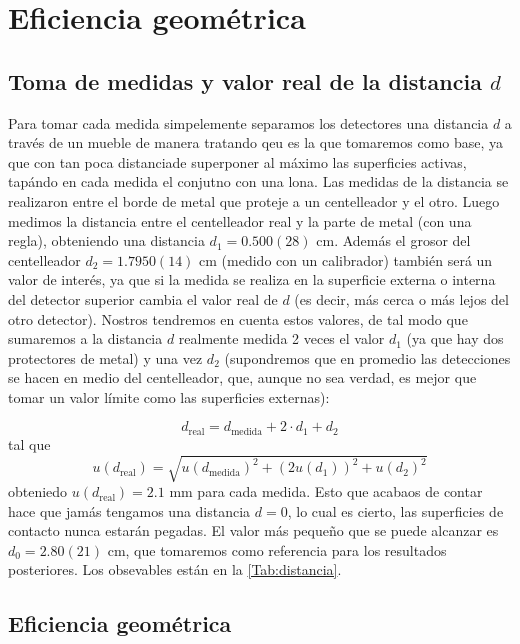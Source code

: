 \documentclass[11pt]{article}
\begin{document}
\section{Eficiencia geométrica}

\subsection{Toma de medidas y valor real de la distancia $d$}

Para tomar cada medida simpelemente separamos los detectores una distancia $d$ a través de un mueble de manera tratando  qeu es la que tomaremos como base, ya que con tan poca distanciade superponer al máximo las superficies activas, tapándo en cada medida el conjutno con una lona. Las medidas de la distancia se realizaron entre el borde de metal que proteje a un centelleador y el otro. Luego medimos la distancia entre el centelleador real y la parte de metal (con una regla), obteniendo una distancia $d_1=0.500(28)$ cm. Además el grosor del centelleador $d_2=1.7950(14)$ cm (medido con un calibrador) también será un valor de interés, ya que si la medida se realiza en la superficie externa o interna del detector superior cambia el valor real de $d$ (es decir, más cerca o más lejos del otro detector). Nostros tendremos en cuenta estos valores, de tal modo que sumaremos a la distancia $d$ realmente medida 2 veces el valor $d_1$ (ya que hay dos protectores de metal) y una vez $d_2$ (supondremos que en promedio las detecciones se hacen en medio del centelleador, que, aunque no sea verdad, es mejor que tomar un valor límite como las superficies externas):

\begin{equation}
	d_{\text{real}} = d_{\text{medida}} + 2 \cdot d_1 + d_2 
\end{equation}
tal que
\begin{equation}
	u(d_{\text{real}}) = \sqrt{u(d_{\text{medida}})^2 + (2 u(d_1))^2 + u(d_2)^2}
\end{equation}
obteniedo $u(d_{\text{real}})=2.1$ mm para cada medida. Esto que acabaos de contar hace que jamás tengamos una distancia $d=0$, lo cual es cierto, las superficies de contacto nunca estarán pegadas. El valor más pequeño que se puede alcanzar es $d_0=2.80(21)$ cm, que tomaremos como referencia para los resultados posteriores. Los obsevables están en la \cref{Tab:distancia}.



\subsection{Eficiencia geométrica}
\end{document}
